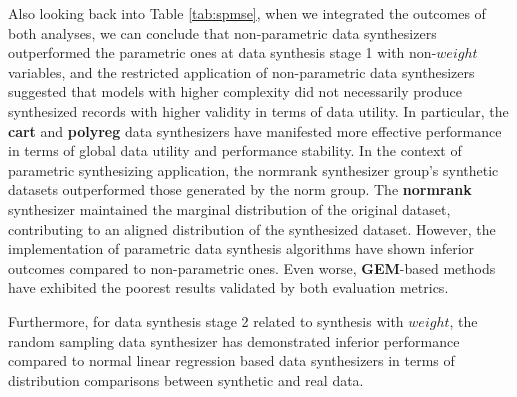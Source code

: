 Also looking back into Table \ref{tab:spmse}, when we integrated the outcomes of both analyses, we can conclude that non-parametric data synthesizers outperformed the parametric ones at data synthesis stage 1 with non-$weight$ variables, and the restricted application of non-parametric data synthesizers suggested that models with higher complexity did not necessarily produce synthesized records with higher validity in terms of data utility. In particular, the \textbf{cart} and \textbf{polyreg} data synthesizers have manifested more effective performance in terms of global data utility and performance stability. In the context of parametric synthesizing application, the normrank synthesizer group's synthetic datasets outperformed those generated by the norm group. The \textbf{normrank} synthesizer maintained the marginal distribution of the original dataset, contributing to an aligned distribution of the synthesized dataset. However, the implementation of parametric data synthesis algorithms have shown inferior outcomes compared to non-parametric ones. Even worse, \textbf{GEM}-based methods have exhibited the poorest results validated by both evaluation metrics.

Furthermore, for data synthesis stage 2 related to synthesis with $weight$, the random sampling data synthesizer has demonstrated inferior performance compared to normal linear regression based data synthesizers in terms of distribution comparisons between synthetic and real data.

